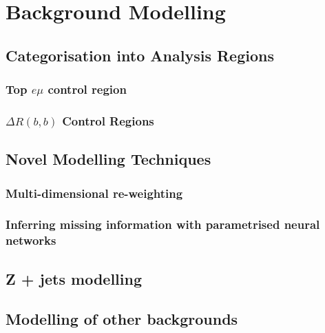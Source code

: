 \chapter{Background Modelling}%
\label{sec:modelling}
\section{Categorisation into Analysis Regions}
\label{sec:ana-regions}
\subsection{Top \texorpdfstring{$e \mu$}{e mu} control region}%
\label{sec:topemucr}
\subsection{\texorpdfstring{$\Delta R(b,b)$}{DRbb} Control Regions}%
\label{sec:control-region-defintions}
\section{Novel Modelling Techniques}%
\label{sec:novel-modelling}
\subsection{Multi-dimensional re-weighting}%
\label{sec:bdtr}
\subsection{Inferring missing information with parametrised neural networks}%
\label{sec:param-net}
\section{Z + jets modelling}%
\label{sec:zjets-modelling}

\section{Modelling of other backgrounds}%
\label{sec:other-backgrounds}
